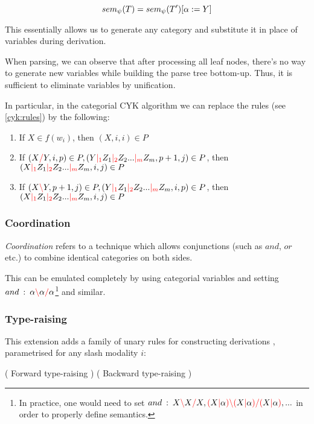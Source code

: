 \documentclass[main.tex]{subfiles}
\begin{document}
\[ sem_{\psi}(T) = sem_{\psi}(T') [ \alpha := Y ] \]

This essentially allows us to generate any category and substitute it in place
of variables during derivation.

When parsing, we can observe that after processing all leaf nodes,
there's no way to generate new variables while building the parse tree
bottom-up. Thus, it is sufficient to eliminate variables by unification.

In particular, in the categorial CYK algorithm we can replace the rules (see \cref{cyk:rules})
by the following:

\begin{enumerate}
    \item If $X \in f(w_i)$, then $(X, i, i) \in P$
    \item If $(X \textcolor{red}{/} Y, i, p) \in P, (Y \textcolor{red}{|_{1}} Z_1 \textcolor{red}{|_{2}} Z_2 ... \textcolor{red}{|_{m}} Z_m, p + 1, j) \in P$,
        then $(X \textcolor{red}{|_{1}} Z_1 \textcolor{red}{|_{2}} Z_2 ... \textcolor{red}{|_{m}} Z_m, i, j) \in P$
    \item If $(X \textcolor{red}{\backslash} Y, p + 1, j) \in P, (Y \textcolor{red}{|_{1}} Z_1 \textcolor{red}{|_{2}} Z_2 ... \textcolor{red}{|_{m}} Z_m, i, p) \in P$,
        then $(X \textcolor{red}{|_{1}} Z_1 \textcolor{red}{|_{2}} Z_2 ... \textcolor{red}{|_{m}} Z_m, i, j) \in P$
\end{enumerate}

\subsubsection{Coordination}
\emph{Coordination} refers to a technique which allows conjunctions (such as
$and$, $or$ etc.) to combine identical categories on both sides.

This can be emulated completely by using categorial variables and setting
$and \hspace{0.5em} {:} \hspace{0.5em} \alpha \textcolor{red}{\backslash} \alpha \textcolor{red}{/} \alpha $\footnote{
    In practice, one would need to set
    $and \hspace{0.5em} {:} \hspace{0.5em} X \textcolor{red}{\backslash} X \textcolor{red}{/} X, \textcolor{red}{(} X \textcolor{red}{|} \alpha \textcolor{red}{)} \textcolor{red}{\backslash} \textcolor{red}{(} X \textcolor{red}{|} \alpha \textcolor{red}{)} \textcolor{red}{/} \textcolor{red}{(} X \textcolor{red}{|} \alpha \textcolor{red}{)}, ...$
    in order to properly define semantics.
} and similar.

\subsubsection{Type-raising}
This extension adds a family of unary rules for constructing derivations \cite[sec.~5.3.1]{nts},
parametrised for any slash modality $i$:
\begin{center}
        ( Forward type-raising )
        ( Backward type-raising )
\end{center}
\end{document}
